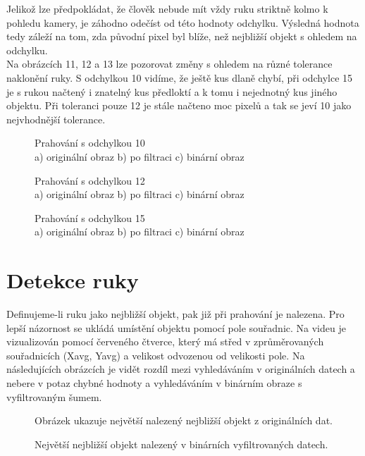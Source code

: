Jelikož lze předpokládat, že člověk nebude mít vždy ruku striktně kolmo k pohledu kamery, je záhodno odečíst od této hodnoty odchylku. Výsledná hodnota tedy záleží na tom, zda původní pixel byl blíže, než nejbližší objekt s ohledem na odchylku.\\
Na obrázcích 11, 12 a 13 lze pozorovat změny s ohledem na různé tolerance naklonění ruky. S odchylkou 10 vidíme, že ještě kus dlaně chybí, při odchylce 15 je s rukou načtený i znatelný kus předloktí a k tomu i nejednotný kus jiného objektu. Při toleranci pouze 12 je stále načteno moc pixelů a tak se jeví 10 jako nejvhodnější tolerance.\\

\begin{figure}[htp]
\centering
{} \hfill
{} \hfill
{}
\caption{Prahování s odchylkou 10 \\ a) originální obraz b) po filtraci c) binární obraz}
\label{fig:tresh10}
\end{figure}
\begin{figure}[htp]
\centering
{} \hfill
{} \hfill
{}
\caption{Prahování s odchylkou 12 \\ a) originální obraz b) po filtraci c) binární obraz}
\label{fig:tresh11}
\end{figure}
\begin{figure}[htp]
\centering
{} \hfill
{} \hfill
{}
\caption{Prahování s odchylkou 15 \\ a) originální obraz b) po filtraci c) binární obraz}
\label{fig:tresh12}
\end{figure}
\newpage
\section{Detekce ruky}
Definujeme-li ruku jako nejbližší objekt, pak již při prahování je nalezena. Pro lepší názornost se ukládá umístění objektu pomocí pole souřadnic. Na videu je vizualizován pomocí červeného čtverce, který má střed v zprůměrovaných souřadnicích (Xavg, Yavg) a velikost odvozenou od velikosti pole. 
Na následujících obrázcích je vidět rozdíl mezi vyhledáváním v originálních datech a nebere v potaz chybné hodnoty a vyhledáváním v binárním obraze s vyfiltrovaným šumem.
\begin{figure}[htp]
\centering
{}
\caption{Obrázek ukazuje největší nalezený nejbližší objekt z originálních dat.}
\label{fig:square_depth}
\end{figure}
\begin{figure}[htp]
\centering
{}
\caption{Největší nejbližší objekt nalezený v binárních vyfiltrovaných datech.}
\label{fig:square_bin}
\end{figure}

